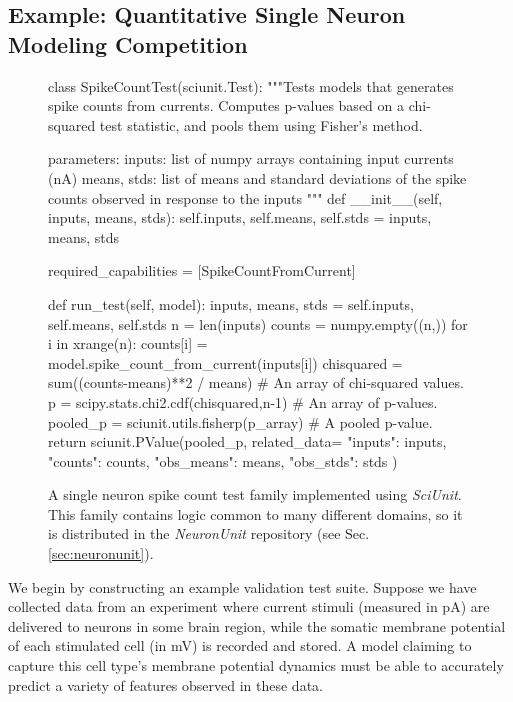 \documentclass[11pt,letterpaper]{article}
\begin{document}
\subsection{Example: Quantitative Single Neuron Modeling Competition}
\begin{figure}
\small
\begin{python}
class SpikeCountTest(sciunit.Test):
  """Tests models that generates spike counts from currents. Computes p-values based on a chi-squared test statistic, and pools them using Fisher's method.

  parameters:
    inputs: list of numpy arrays containing input currents (nA)
    means, stds: list of means and standard deviations of the 
      spike counts observed in response to the inputs
  """
  def __init__(self, inputs, means, stds):
    self.inputs, self.means, self.stds = inputs, means, stds
	
  required_capabilities = [SpikeCountFromCurrent]
	
  def run_test(self, model):
    inputs, means, stds = self.inputs, self.means, self.stds
    n = len(inputs)
    counts = numpy.empty((n,))
    for i in xrange(n):
      counts[i] = model.spike_count_from_current(inputs[i])
    chisquared = sum((counts-means)**2 / means) # An array of chi-squared values.  
    p = scipy.stats.chi2.cdf(chisquared,n-1) # An array of p-values.  
    pooled_p = sciunit.utils.fisherp(p_array) # A pooled p-value.  
    return sciunit.PValue(pooled_p, related_data={
      "inputs": inputs, "counts": counts, "obs_means": means, "obs_stds": stds
    })
\end{python}
\vspace{-5px}
\caption{A single neuron spike count test family implemented using \textit{SciUnit}. This family contains logic common to many different domains, so it is distributed in the \textit{NeuronUnit} repository (see Sec. \ref{sec:neuronunit}).}
\label{fig:rate_test}
\vspace{-15px}
\end{figure}

We begin by constructing an example validation test suite. 
Suppose we have collected data from an experiment where current stimuli (measured in pA) are delivered to neurons in some brain region, while the somatic membrane potential of each stimulated cell (in mV) is recorded and stored.  
A model claiming to capture this cell type's membrane potential dynamics must be able to accurately predict a variety of features observed in these data.
\end{document}
